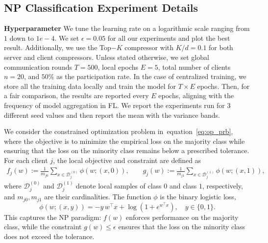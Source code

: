 \documentclass{article} %
\def\eqref#1{equation~\ref{#1}}
\begin{document}
\subsection{NP Classification Experiment Details}
\label{apdx:np_class}
\textbf{Hyperparameter}
We tune the learning rate on a logarithmic scale ranging from $1$ down to $1e-4$. We set $\epsilon = 0.05$ for all our experiments and plot the best result. Additionally, we use the Top$-K$ compressor with $K/d=0.1$ for both server and client compressors. Unless stated otherwise, we set global communication rounds $T=500$, local epochs $E=5$, total number of clients $n=20$, and $50\%$ as the participation rate. In the case of centralized training, we store all the training data locally and train the model for $T\times E$ epochs. Then, for a fair comparison, the results are reported every $E$ epochs, aligning with the frequency of model aggregation in FL. We report the experiments run for 3 different seed values and then report the mean with the variance bands.


We consider the constrained optimization problem in~\eqref{eq:op_prb}, where the objective is to minimize the empirical loss on the majority class while ensuring that the loss on the minority class remains below a prescribed tolerance. For each client $j$, the local objective and constraint are defined as
\begin{align}
    f_j(w) := \frac{1}{m_{j0}} \sum_{x \in \mathcal{D}_j^{(0)}} \phi(w;(x,0)), 
    \qquad
    g_j(w) := \frac{1}{m_{j1}} \sum_{x \in \mathcal{D}_j^{(1)}} \phi(w;(x,1)),
\end{align}
where $\mathcal{D}_j^{(0)}$ and $\mathcal{D}_j^{(1)}$ denote local samples of class $0$ and class $1$, respectively, and $m_{j0}, m_{j1}$ are their cardinalities. The function $\phi$ is the binary logistic loss,
\begin{equation}
    \phi(w;(x,y)) = -y \, w^\top x + \log\!\left(1 + e^{w^\top x}\right),
    \quad y \in \{0,1\}.
\end{equation}
This captures the NP paradigm: $f(w)$ enforces performance on the majority class, while the constraint $g(w) \leq \epsilon$ ensures that the loss on the minority class does not exceed the tolerance.
\end{document}
